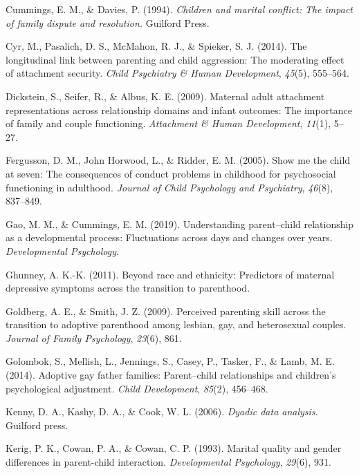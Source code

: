 \documentclass[man]{apa6}
\begin{document}
\leavevmode\hypertarget{ref-cummings1994children}{}%
Cummings, E. M., \& Davies, P. (1994). \emph{Children and marital conflict: The impact of family dispute and resolution.} Guilford Press.

\leavevmode\hypertarget{ref-study3}{}%
Cyr, M., Pasalich, D. S., McMahon, R. J., \& Spieker, S. J. (2014). The longitudinal link between parenting and child aggression: The moderating effect of attachment security. \emph{Child Psychiatry \& Human Development}, \emph{45}(5), 555--564.

\leavevmode\hypertarget{ref-dickstein2009maternal}{}%
Dickstein, S., Seifer, R., \& Albus, K. E. (2009). Maternal adult attachment representations across relationship domains and infant outcomes: The importance of family and couple functioning. \emph{Attachment \& Human Development}, \emph{11}(1), 5--27.

\leavevmode\hypertarget{ref-fergusson2005show}{}%
Fergusson, D. M., John Horwood, L., \& Ridder, E. M. (2005). Show me the child at seven: The consequences of conduct problems in childhood for psychosocial functioning in adulthood. \emph{Journal of Child Psychology and Psychiatry}, \emph{46}(8), 837--849.

\leavevmode\hypertarget{ref-gao2019understanding}{}%
Gao, M. M., \& Cummings, E. M. (2019). Understanding parent--child relationship as a developmental process: Fluctuations across days and changes over years. \emph{Developmental Psychology}.

\leavevmode\hypertarget{ref-ghunney2011beyond}{}%
Ghunney, A. K.-K. (2011). Beyond race and ethnicity: Predictors of maternal depressive symptoms across the transition to parenthood.

\leavevmode\hypertarget{ref-goldberg2009perceived}{}%
Goldberg, A. E., \& Smith, J. Z. (2009). Perceived parenting skill across the transition to adoptive parenthood among lesbian, gay, and heterosexual couples. \emph{Journal of Family Psychology}, \emph{23}(6), 861.

\leavevmode\hypertarget{ref-golombok2014adoptive}{}%
Golombok, S., Mellish, L., Jennings, S., Casey, P., Tasker, F., \& Lamb, M. E. (2014). Adoptive gay father families: Parent--child relationships and children's psychological adjustment. \emph{Child Development}, \emph{85}(2), 456--468.

\leavevmode\hypertarget{ref-apim}{}%
Kenny, D. A., Kashy, D. A., \& Cook, W. L. (2006). \emph{Dyadic data analysis}. Guilford press.

\leavevmode\hypertarget{ref-kerig1993marital}{}%
Kerig, P. K., Cowan, P. A., \& Cowan, C. P. (1993). Marital quality and gender differences in parent-child interaction. \emph{Developmental Psychology}, \emph{29}(6), 931.
\end{document}
